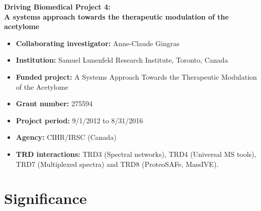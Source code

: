 \documentclass[arial,11pt]{article}
\begin{document}
\begin{center}
\Large
{\bf Driving Biomedical Project 4:\\A systems approach towards the therapeutic modulation of the acetylome}
\normalsize
\end{center}

\begin{itemize}
\item {\bf Collaborating investigator:}  Anne-Claude Gingras
\item {\bf Institution:} Samuel Lunenfeld Research Institute, Toronto, Canada
\item {\bf Funded project:} 	A Systems Approach Towards the Therapeutic Modulation of the Acetylome
\item {\bf Grant number:} 	275594   	
\item {\bf Project period:}   9/1/2012 to 8/31/2016
\item {\bf Agency:}  CIHR/IRSC (Canada)
\item {\bf TRD interactions:}  TRD3 (Spectral networks), TRD4 (Universal MS tools), TRD7 (Multiplexed spectra) and TRD8 (ProteoSAFe, MassIVE).
\end{itemize}

\section{Significance}

\end{document}
